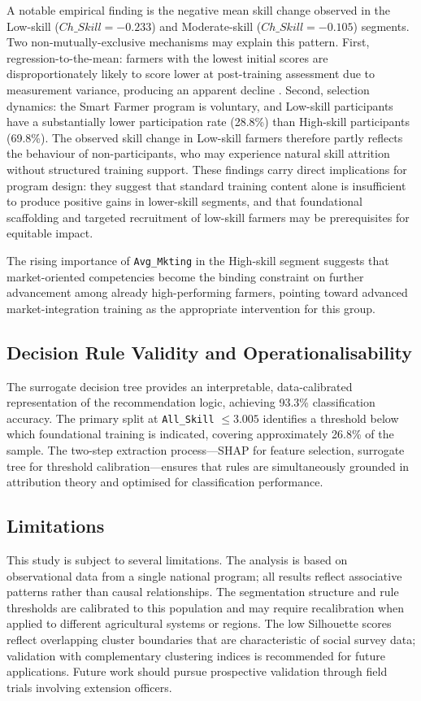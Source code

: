 \documentclass[3p,twocolumn,authoryear]{elsarticle}
\begin{document}
A notable empirical finding is the negative mean skill
change observed in the Low-skill ($Ch\_Skill = -0.233$)
and Moderate-skill ($Ch\_Skill = -0.105$) segments.
Two non-mutually-exclusive mechanisms may explain this pattern.
First, regression-to-the-mean: farmers with the lowest
initial scores are disproportionately likely to score
lower at post-training assessment due to measurement
variance, producing an apparent decline \citep{davis2012}.
Second, selection dynamics: the Smart Farmer program is
voluntary, and Low-skill participants have a
substantially lower participation rate (28.8\%) than
High-skill participants (69.8\%).
The observed skill change in Low-skill farmers therefore
partly reflects the behaviour of non-participants, who
may experience natural skill attrition without structured
training support.
These findings carry direct implications for program
design: they suggest that standard training content alone
is insufficient to produce positive gains in lower-skill
segments, and that foundational scaffolding and targeted
recruitment of low-skill farmers may be prerequisites
for equitable impact.

The rising importance of \texttt{Avg\_Mkting} in the
High-skill segment suggests that market-oriented
competencies become the binding constraint on further
advancement among already high-performing farmers,
pointing toward advanced market-integration training
as the appropriate intervention for this group.

\subsection{Decision Rule Validity and Operationalisability}

The surrogate decision tree provides an interpretable,
data-calibrated representation of the recommendation
logic, achieving 93.3\% classification accuracy.
The primary split at \texttt{All\_Skill} $\leq 3.005$
identifies a threshold below which foundational
training is indicated, covering approximately
26.8\% of the sample.
The two-step extraction process---SHAP for feature
selection, surrogate tree for threshold
calibration---ensures that rules are simultaneously
grounded in attribution theory and optimised for
classification performance.

\subsection{Limitations}

This study is subject to several limitations.
The analysis is based on observational data from a
single national program; all results reflect associative
patterns rather than causal relationships.
The segmentation structure and rule thresholds are
calibrated to this population and may require
recalibration when applied to different agricultural
systems or regions.
The low Silhouette scores reflect overlapping cluster
boundaries that are characteristic of social survey
data; validation with complementary clustering indices
is recommended for future applications.
Future work should pursue prospective validation through
field trials involving extension officers.
\end{document}
